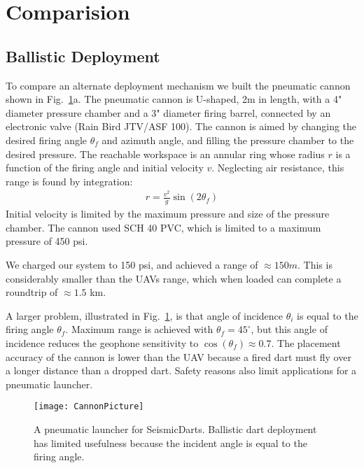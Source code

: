 \section{Comparision}\label{sec:Comparision}

\subsection{Ballistic Deployment}
To compare an alternate deployment mechanism we built the pneumatic cannon shown in Fig.~\ref{fig:CannonPicture}a.
The pneumatic cannon is U-shaped,  2m in length, with a 4" diameter pressure chamber and a 3" diameter firing barrel, connected by an electronic valve (Rain Bird JTV/ASF 100). 
The cannon is aimed by changing the desired firing angle $\theta_f$  and azimuth angle, and filling the pressure chamber to the desired pressure.  
The reachable workspace is an annular ring whose radius $r$ is a function of the firing angle and initial velocity $v$. 
Neglecting air resistance, this range is found by integration:
\begin{align}
r = \frac{v^2}{g} \sin( 2 \theta_f )
\end{align} 
Initial velocity is limited by the maximum pressure and size of the pressure chamber.
The cannon used  SCH 40 PVC, which is limited to a maximum pressure of 450 psi.

We charged our system to 150 psi, and achieved a range of $\approx 150 m$.
This is considerably smaller than the UAVs range, which when loaded can complete a roundtrip of $\approx 1.5$ km.

A larger problem, illustrated in Fig.~\ref{fig:CannonPicture}, is that angle of incidence $\theta_i$ is equal to the firing angle $\theta_f$. 
Maximum range is achieved with $\theta_f = 45^\circ$, but this angle of incidence reduces the geophone sensitivity to $\cos(\theta_f )\approx 0.7$.
The placement accuracy of the cannon is lower than the UAV because a fired dart must fly over a longer distance than a dropped dart. 
Safety reasons also limit applications for a pneumatic launcher.


\begin{figure} \centering
  {\texttt{[image: CannonPicture]}}
 \caption{A pneumatic launcher for SeismicDarts.  Ballistic dart deployment has limited usefulness because the incident angle is equal to the firing angle.} 
 \label{fig:CannonPicture}
\end{figure}



